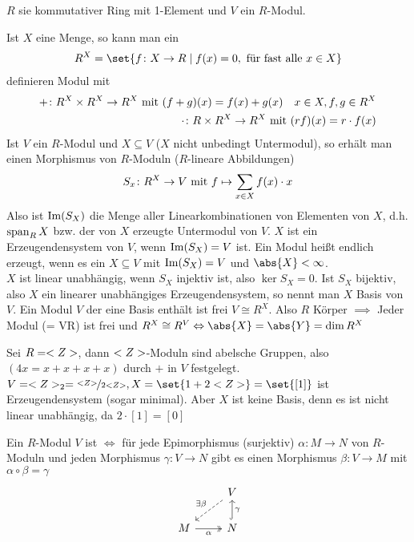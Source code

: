 $R$ sie kommutativer Ring mit 1-Element und $V$ ein $R$-Modul.
\begin{erinnerung}
	Ist $X$ eine Menge, so kann man ein
	\begin{align*}
		R^{X} = \set{f\colon X \to R \mid f(x) = 0, \text{ für fast alle }x \in X}
	\end{align*}
	definieren Modul mit
	\begin{align*}
		+ \colon R^X \times R^X \to R^X \mit (f+g)(x) = f(x)+g(x)\quad x \in X, f,g \in R^X\\
		\cdot\colon R \times R^X \to R^X \mit (rf)(x) = r\cdot f(x)
	\end{align*}
	Ist $V$ ein $R$-Modul und $X \subseteq V$ ($X$ nicht unbedingt Untermodul), so erhält man einen Morphismus von $R$-Moduln ($R$-lineare Abbildungen)
	\begin{align*}
		S_x\colon R^X \to V \mit f \mapsto \sum_{x\in X}f(x)\cdot x
	\end{align*}
	Also ist $\Image(S_X)$ die Menge aller Linearkombinationen von Elementen von $X$, d.h. $\Span_R X$ bzw. der von $X$ erzeugte Untermodul von $V$. $X$ ist ein Erzeugendensystem von $V$, wenn $\Image(S_X) = V$ ist. Ein Modul heißt endlich erzeugt, wenn es ein $X \subseteq V$ mit $\Image(S_X) = V$ und $\abs{X} < \infty$.\\
	$X$ ist linear unabhängig, wenn $S_X$ injektiv ist, also $\ker S_X = 0$. Ist $S_X$ bijektiv, also $X$ ein linearer unabhängiges Erzeugendensystem, so nennt man $X$ Basis von $V$. Ein Modul $V$ der eine Basis enthält ist frei $V \cong R^X$. Also $R$ Körper $\implies$ Jeder Modul (= VR) ist frei und $R^X \cong R^V \Leftrightarrow \abs{X} = \abs{Y} = \dim R^X$
\end{erinnerung}
\begin{example}
	Sei $R = \Z$, dann $\Z$-Moduln sind abelsche Gruppen, also $(4x = x+x+x+x)$ durch $+$ in $V$ festgelegt. $V = \Z_2 = \lnkset{\Z}{2 \Z}, X = \set{1 + 2\Z} = \set{[1]}$ ist Erzeugendensystem (sogar minimal). Aber $X$ ist keine Basis, denn es ist nicht linear unabhängig, da $2 \cdot [1] = [0]$
\end{example}
\begin{definition}
	Ein $R$-Modul $V$ ist  $\Leftrightarrow$ für jede Epimorphismus (surjektiv) $\alpha \colon M \to N$ von $R$-Moduln und jeden Morphismus $\gamma \colon V \to N$ gibt es einen Morphismus $\beta \colon V \to M$ mit $\alpha \circ \beta = \gamma$
	\[
		\begin{tikzcd}
		& V \arrow[ld, "\exists \beta"', dashed] \\
		M \arrow[r, "\alpha"', two heads] & N \arrow[u, "\gamma"', hook]          
		\end{tikzcd}
	\]
\end{definition}

